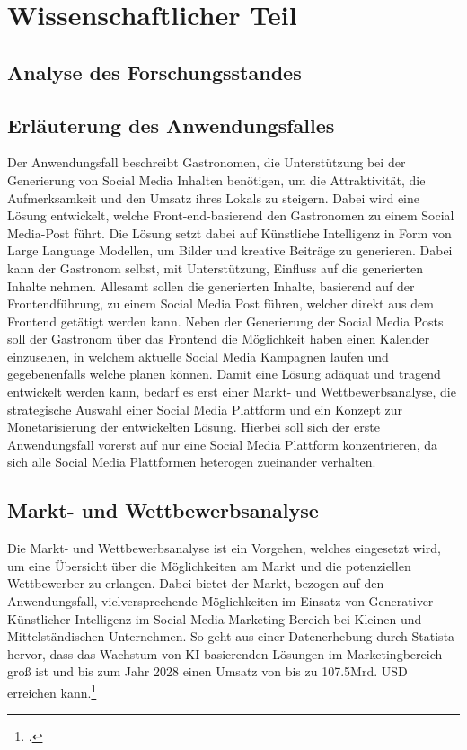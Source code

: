\newpage
\section{Wissenschaftlicher Teil}

\subsection{Analyse des Forschungsstandes}

\subsection{Erläuterung des Anwendungsfalles}
Der Anwendungsfall beschreibt Gastronomen, die Unterstützung bei der Generierung von Social Media Inhalten benötigen, um die Attraktivität, die Aufmerksamkeit und den Umsatz ihres Lokals zu steigern.
Dabei wird eine Lösung entwickelt, welche Front-end-basierend den Gastronomen zu einem Social Media-Post führt.
Die Lösung setzt dabei auf Künstliche Intelligenz in Form von Large Language Modellen, um Bilder und kreative Beiträge zu generieren.
Dabei kann der Gastronom selbst, mit Unterstützung, Einfluss auf die generierten Inhalte nehmen.
Allesamt sollen die generierten Inhalte, basierend auf der Frontendführung, zu einem Social Media Post führen, welcher direkt aus dem Frontend getätigt werden kann.
Neben der Generierung der Social Media Posts soll der Gastronom über das Frontend die Möglichkeit haben einen Kalender einzusehen, in welchem aktuelle Social Media Kampagnen laufen und gegebenenfalls welche planen können.
Damit eine Lösung adäquat und tragend entwickelt werden kann, bedarf es erst einer Markt- und Wettbewerbsanalyse, die strategische Auswahl einer Social Media Plattform und ein Konzept zur Monetarisierung der entwickelten Lösung.
Hierbei soll sich der erste Anwendungsfall vorerst auf nur eine Social Media Plattform konzentrieren, da sich alle Social Media Plattformen heterogen zueinander verhalten.

\subsection{Markt- und Wettbewerbsanalyse}
Die Markt- und Wettbewerbsanalyse ist ein Vorgehen, welches eingesetzt wird, um eine Übersicht über die Möglichkeiten am Markt und die potenziellen Wettbewerber zu erlangen.
Dabei bietet der Markt, bezogen auf den Anwendungsfall, vielversprechende Möglichkeiten im Einsatz von Generativer Künstlicher Intelligenz im Social Media Marketing Bereich bei Kleinen und Mittelständischen Unternehmen.
So geht aus einer Datenerhebung durch Statista hervor, dass das Wachstum von KI-basierenden Lösungen im Marketingbereich groß ist und bis zum Jahr 2028 einen Umsatz von bis zu 107.5Mrd. USD erreichen kann.\footcite{statista_ai_marketing_europe}

